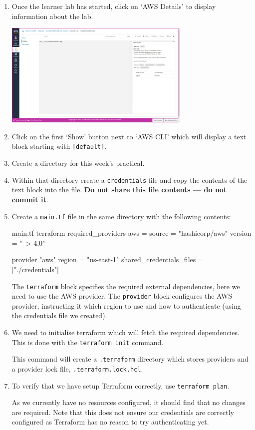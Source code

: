 \documentclass{csse4400}
\begin{document}
\begin{enumerate}
\item Once the learner lab has started, click on `AWS Details' to display information about the lab.

\includegraphics[width=0.7\textwidth]{images/aws-details}

\item Click on the first `Show' button next to `AWS CLI' which will display a text block starting with \texttt{[default]}.
\item Create a directory for this week's practical.
\item Within that directory create a \texttt{credentials} file and copy the contents of the text block into the file.
\textbf{Do not share this file contents --- do not commit it}.
\item Create a \texttt{main.tf} file in the same directory with the following contents:
\begin{code}[language=terraform]{main.tf}
terraform {
    required_providers {
        aws = {
            source  = "hashicorp/aws"
            version = "~> 4.0"
        }
    }
}

provider "aws" {
    region = "us-east-1"
    shared_credentials_files = ["./credentials"]
}
\end{code}

The \texttt{terraform} block specifies the required external dependencies, here we need to use the AWS provider.
The \texttt{provider} block configures the AWS provider, instructing it which region to use and how to authenticate (using the credentials file we created).

\item We need to initialise terraform which will fetch the required dependencies. This is done with the \texttt{terraform init} command.

This command will create a \texttt{.terraform} directory which stores providers and a provider lock file, \texttt{.terraform.lock.hcl}.

\item To verify that we have setup Terraform correctly, use \texttt{terraform plan}.

As we currently have no resources configured, it should find that no changes are required.
Note that this does not ensure our credentials are correctly configured as Terraform has no reason to try authenticating yet.

\end{enumerate}
\end{document}

